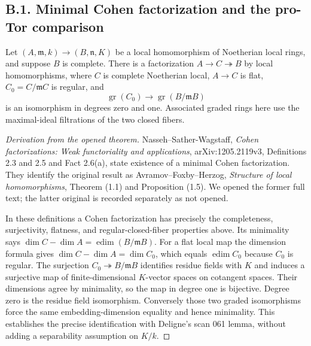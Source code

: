 \subsection{B.1. Minimal Cohen factorization and the pro-Tor comparison}

\begin{theorem}\label{SA23-B1-1}
Let $(A,\mathfrak m,k)\to(B,\mathfrak n,K)$ be a local homomorphism
of Noetherian local rings, and suppose $B$ is complete.  There is a
factorization $A\to C\twoheadrightarrow B$ by local homomorphisms,
where $C$ is complete Noetherian local, $A\to C$ is flat, $C_0=C/\mathfrak mC$
is regular, and
\[
 \operatorname{gr}(C_0)\longrightarrow\operatorname{gr}(B/\mathfrak mB)
\]
is an isomorphism in degrees zero and one.  Associated graded rings
here use the maximal-ideal filtrations of the two closed fibers.
\end{theorem}
\begin{proof}[Derivation from the opened theorem]
Nasseh--Sather-Wagstaff, \emph{Cohen factorizations: Weak functoriality
and applications}, arXiv:1205.2119v3, Definitions 2.3 and 2.5 and
Fact 2.6(a), state existence of a minimal Cohen factorization.
They identify the original result as Avramov--Foxby--Herzog,
\emph{Structure of local homomorphisms}, Theorem (1.1) and
Proposition (1.5).  We opened the former full text; the latter original
is recorded separately as not opened.

In these definitions a Cohen factorization has precisely the
completeness, surjectivity, flatness, and regular-closed-fiber properties
above.  Its minimality says
$\dim C-\dim A=\operatorname{edim}(B/\mathfrak mB)$.
For a flat local map the dimension formula gives
$\dim C-\dim A=\dim C_0$, which equals
$\operatorname{edim}C_0$ because $C_0$ is regular.  The surjection
$C_0\twoheadrightarrow B/\mathfrak mB$ identifies residue fields with
$K$ and induces a surjective map of finite-dimensional $K$-vector
spaces on cotangent spaces.  Their dimensions agree by minimality,
so the map in degree one is bijective.  Degree zero is the residue
field isomorphism.  Conversely those two graded isomorphisms force
the same embedding-dimension equality and hence minimality.  This
establishes the precise identification with Deligne's scan 061 lemma,
without adding a separability assumption on $K/k$.
\end{proof}

